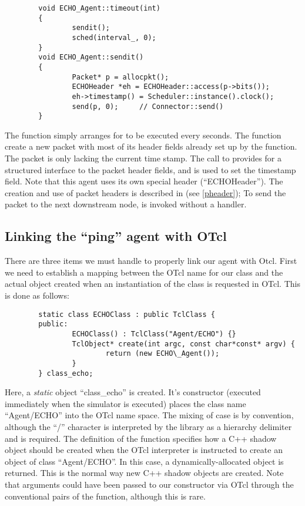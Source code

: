\begin{small}
\begin{verbatim}
        void ECHO_Agent::timeout(int)
        {
                sendit();
                sched(interval_, 0);
        }
        void ECHO_Agent::sendit()
        {
                Packet* p = allocpkt();
                ECHOHeader *eh = ECHOHeader::access(p->bits());
                eh->timestamp() = Scheduler::instance().clock();
                send(p, 0);     // Connector::send()
        }
\end{verbatim}
\end{small}

The  function simply arranges for  to be
executed every  seconds.
The  function create a new packet with most of its
header fields already set up by the  function.
The packet is only lacking the current time stamp. 
The call to  provides for a structured interface to the
packet header fields, and is used to set the timestamp field.
Note that this agent uses its own special header (``ECHOHeader'').
The creation and use of packet headers is described in (see \ref{pheader});
To send the packet to the next downstream node, 
is invoked without a handler.

\subsection{Linking the ``ping'' agent with OTcl}

There are three items we must handle to properly link our agent
with Otcl.
First we need to establish a mapping between the OTcl name
for our class and the actual object created when an
instantiation of the class is requested in OTcl.
This is done as follows:
\begin{small}
\begin{verbatim}
        static class ECHOClass : public TclClass {
        public:
                ECHOClass() : TclClass("Agent/ECHO") {}
                TclObject* create(int argc, const char*const* argv) {
                        return (new ECHO\_Agent());
                }
        } class_echo;
\end{verbatim}
\end{small}

Here, a {\em static} object ``class\_echo'' is created. It's constructor
(executed immediately when the simulator is executed) places the class name
``Agent/ECHO'' into the OTcl name space.  The mixing of case is
by convention, although the ``/'' character is interpreted by the
 library as a hierarchy delimiter and is required.
The definition of the  function specifies how a C++
shadow object should be created when
the OTcl interpreter is instructed to create an
object of class ``Agent/ECHO''.  In this case, a dynamically-allocated
object is returned.  This is the normal way new C++ shadow objects
are created.
Note that arguments could have been passed to our constructor
via OTcl through the conventional  pairs of the
 function, although this is rare.

